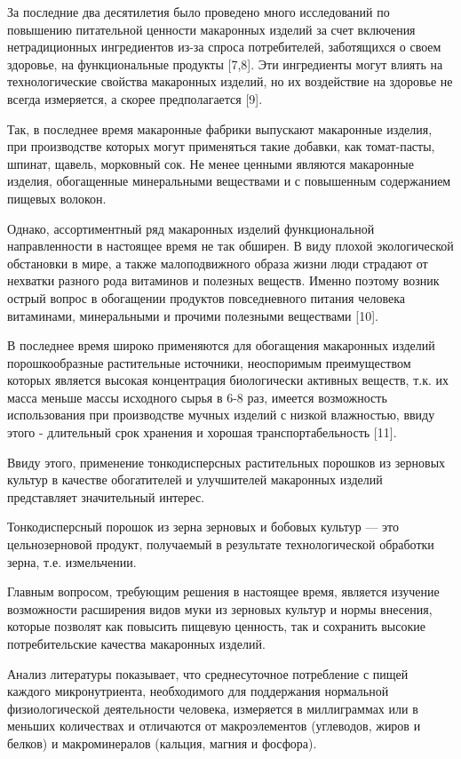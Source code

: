 За последние два десятилетия было проведено много исследований по
повышению питательной ценности макаронных изделий за счет включения
нетрадиционных ингредиентов из-за спроса потребителей, заботящихся о
своем здоровье, на функциональные продукты {[}7,8{]}. Эти ингредиенты
могут влиять на технологические свойства макаронных изделий, но их
воздействие на здоровье не всегда измеряется, а скорее предполагается
{[}9{]}.

Так, в последнее время макаронные фабрики выпускают макаронные изделия,
при производстве которых могут применяться такие добавки, как
томат-пасты, шпинат, щавель, морковный сок. Не менее ценными являются
макаронные изделия, обогащенные минеральными веществами и с повышенным
содержанием пищевых волокон.

Однако, ассортиментный ряд макаронных изделий функциональной
направленности в настоящее время не так обширен. В виду плохой
экологической обстановки в мире, а также малоподвижного образа жизни
люди страдают от нехватки разного рода витаминов и полезных веществ.
Именно поэтому возник острый вопрос в обогащении продуктов повседневного
питания человека витаминами, минеральными и прочими полезными веществами
{[}10{]}.

В последнее время широко применяются для обогащения макаронных изделий
порошкообразные растительные источники, неоспоримым преимуществом
которых является высокая концентрация биологически активных веществ,
т.к. их масса меньше массы исходного сырья в 6-8 раз, имеется
возможность использования при производстве мучных изделий с низкой
влажностью, ввиду этого - длительный срок хранения и хорошая
транспортабельность {[}11{]}.

Ввиду этого, применение тонкодисперсных растительных порошков из
зерновых культур в качестве обогатителей и улучшителей макаронных
изделий представляет значительный интерес.

Тонкодисперсный порошок из зерна зерновых и бобовых культур --- это
цельнозерновой продукт, получаемый в результате технологической
обработки зерна, т.е. измельчении.

Главным вопросом, требующим решения в настоящее время, является изучение
возможности расширения видов муки из зерновых культур и нормы внесения,
которые позволят как повысить пищевую ценность, так и сохранить высокие
потребительские качества макаронных изделий.

Анализ литературы показывает, что среднесуточное потребление с пищей
каждого микронутриента, необходимого для поддержания нормальной
физиологической деятельности человека, измеряется в миллиграммах или в
меньших количествах и отличаются от макроэлементов (углеводов, жиров и
белков) и макроминералов (кальция, магния и фосфора).

